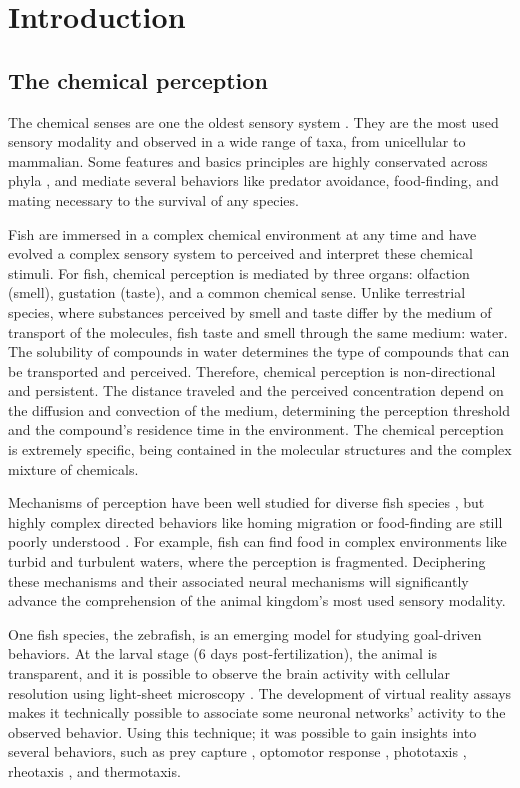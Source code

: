 \chapter{Introduction}

  \section{The chemical perception}
  The chemical senses are one the oldest sensory system \cite{yohe2018evolutionary}. They are the most used sensory modality and observed in a wide range of taxa, from unicellular \cite{bardwell2005walk} to mammalian. Some features and basics principles are highly conservated across phyla \cite{hildebrand1997mechanisms,yarmolinsky2009common}, and mediate several behaviors like predator avoidance, food-finding, and mating necessary to the survival of any species.

  Fish are immersed in a complex chemical environment at any time and have evolved a complex sensory system to perceived and interpret these chemical stimuli. For fish, chemical perception is mediated by three organs: olfaction (smell), gustation (taste), and a common chemical sense. Unlike terrestrial species, where substances perceived by smell and taste differ by the medium of transport of the molecules, fish taste and smell through the same medium: water. The solubility of compounds in water determines the type of compounds that can be transported and perceived. Therefore, chemical perception is non-directional and persistent. The distance traveled and the perceived concentration depend on the diffusion and convection of the medium, determining the perception threshold and the compound's residence time in the environment. The chemical perception is extremely specific, being contained in the molecular structures and the complex mixture of chemicals.

  Mechanisms of perception have been well studied for diverse fish species \cite{hara2012fish}, but highly complex directed behaviors like homing migration or food-finding are still poorly understood \cite{hansen2004chemosensory}. For example, fish can find food in complex environments like turbid and turbulent waters, where the perception is fragmented. Deciphering these mechanisms and their associated neural mechanisms will significantly advance the comprehension of the animal kingdom's most used sensory modality.

  One fish species, the zebrafish, is an emerging model for studying goal-driven behaviors. At the larval stage (6 days post-fertilization), the animal is transparent, and it is possible to observe the brain activity with cellular resolution using light-sheet microscopy \cite{panier2013fast}. The development of virtual reality assays makes it technically possible to associate some neuronal networks' activity to the observed behavior. Using this technique; it was possible to gain insights into several behaviors, such as prey capture \cite{bianco2011prey}, optomotor response \cite{naumann2016whole}, phototaxis \cite{wolf2017sensorimotor}, rheotaxis \cite{olive2016rheotaxis}, and thermotaxis\cite{haesemeyer2019convergent}.

